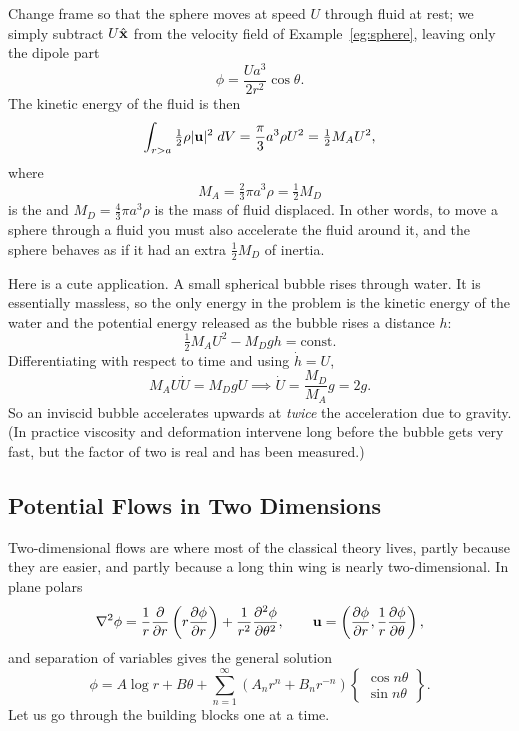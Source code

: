 \documentclass[a4paper]{scrartcl}
\newcommand{\pd}[2]{\frac{\partial #1}{\partial #2}}
\newcommand{\pdd}[2]{\frac{\partial^2 #1}{\partial #2^2}}
\newcommand{\hh}[1]{\hat{\vv{#1}}}
\begin{document}
\begin{example}
	Change frame so that the sphere moves at speed $U$ through fluid at rest; we simply subtract $U\hh x$ from the velocity field of Example~\ref{eg:sphere}, leaving only the dipole part
	$$
	\phi = \frac{Ua^3}{2r^2}\cos\theta.
	$$
	The kinetic energy of the fluid is then
	$$
	\int_{r>a} \tfrac{1}{2}\rho|\mathbf{u}|^2 \; d V = \frac{\pi}{3}a^3 \rho U^2 = \tfrac{1}{2}M_A U^2,
	$$
	where
	$$
	M_A = \tfrac{2}{3}\pi a^3 \rho = \tfrac{1}{2}M_D
	$$
	is the  and $M_D = \tfrac{4}{3}\pi a^3\rho$ is the mass of fluid displaced. In other words, to move a sphere through a fluid you must also accelerate the fluid around it, and the sphere behaves as if it had an extra $\tfrac{1}{2}M_D$ of inertia.

	Here is a cute application. A small spherical bubble rises through water. It is essentially massless, so the only energy in the problem is the kinetic energy of the water and the potential energy released as the bubble rises a distance $h$:
	$$
	\tfrac{1}{2}M_A U^2 - M_D g h = \text{const}.
	$$
	Differentiating with respect to time and using $\dot h = U$,
	$$
	M_A U \dot U = M_D g U \implies \dot U = \frac{M_D}{M_A}g = 2g.
	$$
	So an inviscid bubble accelerates upwards at \emph{twice} the acceleration due to gravity. (In practice viscosity and deformation intervene long before the bubble gets very fast, but the factor of two is real and has been measured.)
\end{example}

\subsection{Potential Flows in Two Dimensions}

Two-dimensional flows are where most of the classical theory lives, partly because they are easier, and partly because a long thin wing is nearly two-dimensional. In plane polars
$$
\nabla^2 \phi = \frac{1}{r}\pd{}{r}\left(r \pd{\phi}{r}\right) + \frac{1}{r^2}\pdd{\phi}{\theta}, \qquad \vv u = \left(\pd{\phi}{r}, \frac{1}{r}\pd{\phi}{\theta}\right),
$$
and separation of variables gives the general solution
$$
\phi = A\log r + B\theta + \sum_{n=1}^\infty \left(A_n r^n + B_n r^{-n}\right)\left\{\begin{matrix}\cos n\theta \\ \sin n\theta\end{matrix}\right\}.
$$
Let us go through the building blocks one at a time.
\end{document}
